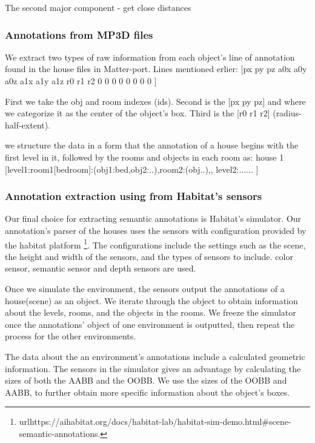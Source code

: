 The second major component - get close distances 


\subsubsection{Annotations from MP3D files}


We extract two types of raw information from each object's line of annotation found in the house files in Matter-port. Lines mentioned erlier: [px py pz  a0x a0y a0z  a1x a1y a1z  r0 r1 r2 0 0 0 0 0 0 0 0 ] 

First we take the obj and room indexes (ids). Second is the [px py pz] and where we categorize it as the center of the object's box. Third is the [r0 r1 r2] (radius-half-extent).

we structure the data in a form that the annotation of a house begins with the first level in it, followed by the rooms and objects in each room as: house 1 [{level1:room1[bedroom]:(obj1:bed,obj2:..),room2:(obj..)},, {level2:......} ]  

\subsubsection{Annotation extraction using from Habitat's sensors}

Our final choice for extracting semantic annotations is Habitat's simulator. Our annotation's parser of the houses uses the sensors with configuration provided by the habitat platform \footnote{url{https://aihabitat.org/docs/habitat-lab/habitat-sim-demo.html#scene-semantic-annotations}.}. The configurations include the settings such as the scene, the height and width of the sensors, and the types of sensors to include. color sensor, semantic sensor and depth sensors are used. 

Once we simulate the environment, the sensors output the annotations of a house(scene) as an object. We iterate through the object to obtain information about the levels, rooms, and the objects in the rooms. We freeze the simulator once the annotations' object of one environment is outputted, then repeat the process for the other environments. 

The data about the an environment's annotations include a calculated geometric information. The sensors in the simulator gives an advantage by calculating the sizes of both the AABB and the OOBB. We use the sizes of the OOBB and AABB, to further obtain more specific information about the object's boxes. 


